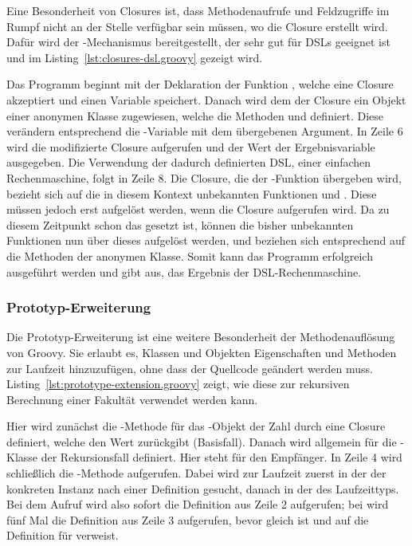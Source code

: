 Eine Besonderheit von Closures ist, dass Methodenaufrufe und Feldzugriffe im Rumpf nicht an der Stelle verfügbar sein müssen, wo die Closure erstellt wird.
Dafür wird der -Mechanismus bereitgestellt, der sehr gut für DSLs geeignet ist und im Listing~\ref{lst:closures-dsl.groovy} gezeigt wird.


Das Programm beginnt mit der Deklaration der Funktion , welche eine Closure akzeptiert und einen Variable  speichert.
Danach wird dem  der Closure ein Objekt einer anonymen Klasse zugewiesen, welche die Methoden  und  definiert.
Diese verändern entsprechend die -Variable mit dem übergebenen Argument.
In Zeile 6 wird die modifizierte Closure aufgerufen und der Wert der Ergebnisvariable ausgegeben.
Die Verwendung der dadurch definierten DSL, einer einfachen Rechenmaschine, folgt in Zeile 8.
Die Closure, die der -Funktion übergeben wird, bezieht sich auf die in diesem Kontext unbekannten Funktionen  und .
Diese müssen jedoch erst aufgelöst werden, wenn die Closure aufgerufen wird.
Da zu diesem Zeitpunkt schon das  gesetzt ist, können die bisher unbekannten Funktionen nun über dieses aufgelöst werden, und beziehen sich entsprechend auf die Methoden der anonymen Klasse.
Somit kann das Programm erfolgreich ausgeführt werden und gibt  aus, das Ergebnis der DSL-Rechenmaschine.

\subsubsection{Prototyp-Erweiterung}

Die Prototyp-Erweiterung ist eine weitere Besonderheit der Methodenauflösung von Groovy.
Sie erlaubt es, Klassen und Objekten Eigenschaften und Methoden zur Laufzeit hinzuzufügen, ohne dass der Quellcode geändert werden muss.
Listing~\ref{lst:prototype-extension.groovy} zeigt, wie diese zur rekursiven Berechnung einer Fakultät verwendet werden kann.


Hier wird zunächst die -Methode für das -Objekt der Zahl  durch eine Closure definiert, welche den Wert  zurückgibt (Basisfall).
Danach wird allgemein für die -Klasse der Rekursionsfall definiert.
Hier steht  für den Empfänger.
In Zeile 4 wird schließlich die -Methode aufgerufen.
Dabei wird zur Laufzeit zuerst in der  der konkreten Instanz nach einer Definition gesucht, danach in der  des Laufzeittyps.
Bei dem Aufruf  wird also sofort die Definition aus Zeile 2 aufgerufen;
bei  wird fünf Mal die Definition aus Zeile 3 aufgerufen, bevor  gleich  ist und  auf die Definition für  verweist.

